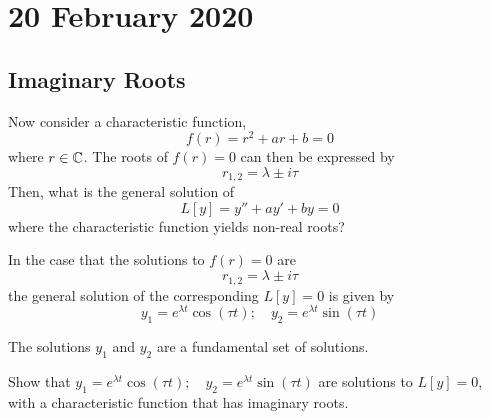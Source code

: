 \documentclass[diffeq.tex]{subfiles}
\begin{document}
\chapter{20 February 2020}
\section{Imaginary Roots}
Now consider a characteristic function,
\begin{equation}
    f(r) = r^{2} + ar + b = 0
\end{equation}
where $r \in \mathbb{C}$. The roots of $f(r) = 0$ can then be expressed by
\begin{equation}
    r_{1,2} = \lambda \pm i\tau
\end{equation}
Then, what is the general solution of
\begin{equation}
    L[y] = y'' + ay' + by = 0
\end{equation}
where the characteristic function yields non-real roots?
\begin{btheorem}
    In the case that the solutions to $f(r) = 0$ are
    \begin{equation}
        r_{1,2} = \lambda \pm i\tau
    \end{equation}
    the general solution of the corresponding $L[y] = 0$ is given by
    \begin{equation}
        y_{1} = e^{\lambda t}\cos(\tau t);\quad y_{2} = e^{\lambda t}\sin(\tau t)
    \end{equation}
    
    The solutions $y_{1}$ and $y_{2}$ are a fundamental set of solutions.
\end{btheorem}
\begin{homework}
    Show that $y_{1} = e^{\lambda t}\cos(\tau t);\quad y_{2} = e^{\lambda t}\sin(\tau t)$ are solutions to $L[y] = 0$, with a characteristic function that has imaginary roots.
\end{homework}
\end{document}
